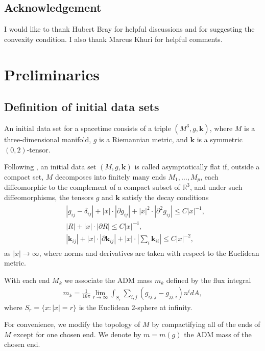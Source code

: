 \documentclass[11pt,letterpaper]{amsart}
\theoremstyle{definition}
\theoremstyle{remark}
\begin{document}
\subsection*{Acknowledgement} I would like to thank Hubert Bray for helpful discussions and for suggesting the convexity condition. I also thank Marcus Khuri for helpful comments.

\section{Preliminaries}\label{section-preliminary}
\subsection{Definition of initial data sets}
An initial data set for a spacetime consists of a triple $(M^3, g, \mathbf{k})$, where $M$ is a three-dimensional manifold, $g$ is a Riemannian metric, and $\mathbf{k}$ is a symmetric $(0,2)$-tensor. 

Following \cite{SchoenYau81}, an initial data set $(M, g, \mathbf{k})$ is called asymptotically flat if, outside a compact set, $M$ decomposes into finitely many ends $M_1, \ldots, M_{p}$, each diffeomorphic to the complement of a compact subset of $\mathbb{R}^{3}$, and under such diffeomorphisms, the tensors $g$ and $\mathbf{k}$ satisfy the decay conditions
\begin{align}\label{AF-condition-0}
	\begin{split}
		&|g_{ij} - \delta _{ij}| + |x| \cdot |\partial g_{ij}| + |x|^2 \cdot |\partial ^2 g_{ij}| \leq C |x| ^{-1},\\
	& |R| + |x| \cdot |\partial R| \leq C |x|^{-4},\\
	& |\mathbf{k}_{ij}| + |x|\cdot  |\partial \mathbf{k}_{ij}|  + |x|\cdot  \left| \textstyle \sum_{i} \mathbf{k}_{ii}\right|  \leq C |x|^{-2},
	\end{split}
\end{align} 
as $|x|\to \infty$, where norms and derivatives are taken with respect to the Euclidean metric. 

With each end $M_k$ we associate the ADM mass $m_k$ defined by the flux integral
\begin{align}\label{defn-mass}
	m_k = \frac{1}{16 \pi } \lim_{r\to \infty}   \int_{S_r} \sum_{i,j}^{}\left( g_{ij,j} - g_{jj,i} \right) n ^{i} dA,
\end{align} 
where $S_r= \{x: |x|=r\} $ is the Euclidean $2$-sphere at infinity. 

For convenience, we modify the topology of $M$ by compactifying all of the ends of $M$ except for one chosen end. We denote by $m= m(g)$ the ADM mass of the chosen end.
\end{document}
